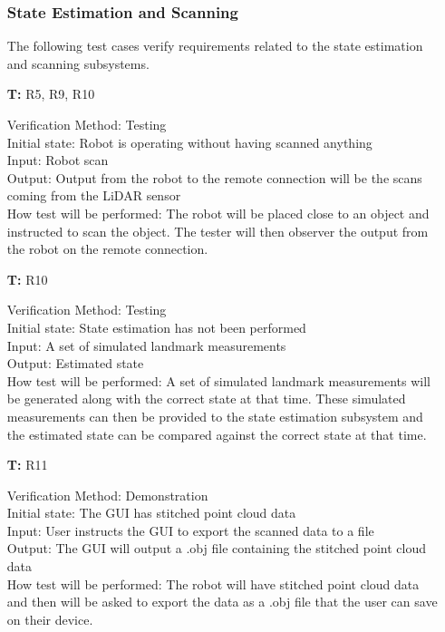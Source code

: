 \documentclass[12pt, titlepage]{article}
\newcounter{tnum} %
\begin{document}
\begin{itemize}
\subsubsection{State Estimation and Scanning}

The following test cases verify requirements related to the state estimation and scanning subsystems.

\item[\textbf{T\refstepcounter{tnum}\thetnum:}]{R5, R9, R10\\}

Verification Method: Testing\\
Initial state: Robot is operating without having scanned anything \\
Input: Robot scan\\
Output: Output from the robot to the remote connection will be the scans coming from the LiDAR sensor\\
How test will be performed: The robot will be placed close to an object and instructed to scan the object. The tester will then observer the output from the robot on the remote connection. \\

\item[\textbf{T\refstepcounter{tnum}\thetnum:}]{R10\\}

Verification Method: Testing\\
Initial state: State estimation has not been performed \\
Input: A set of simulated landmark measurements \\
Output: Estimated state\\
How test will be performed: A set of simulated landmark measurements will be generated along with the correct state at that time. These simulated measurements can then be provided to the state estimation subsystem and the estimated state can be compared against the correct state at that time.   \\

\item[\textbf{T\refstepcounter{tnum}\thetnum:}]{R11\\}

Verification Method: Demonstration\\
Initial state: The GUI has stitched point cloud data\\
Input: User instructs the GUI to export the scanned data to a file\\
Output: The GUI will output a .obj file containing the stitched point cloud data  \\
How test will be performed: The robot will have stitched point cloud data and then will be asked to export the data as a .obj file that the user can save on their device. \\


\end{itemize}
\end{document}
